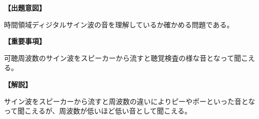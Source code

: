 \noindent \textbf{【出題意図】}

\noindent 時間領域ディジタルサイン波の音を理解しているか確かめる問題である。

\vspace{1em}
\noindent \textbf{【重要事項】}

\bigskip
\noindent\quad 可聴周波数のサイン波をスピーカーから流すと聴覚検査の様な音となって聞こえる。


\vspace{1em}
\noindent \textbf{【解説】}

\noindent サイン波をスピーカーから流すと周波数の違いによりピーやポーといった音となって聞こえるが、周波数が低いほど低い音として聞こえる。
